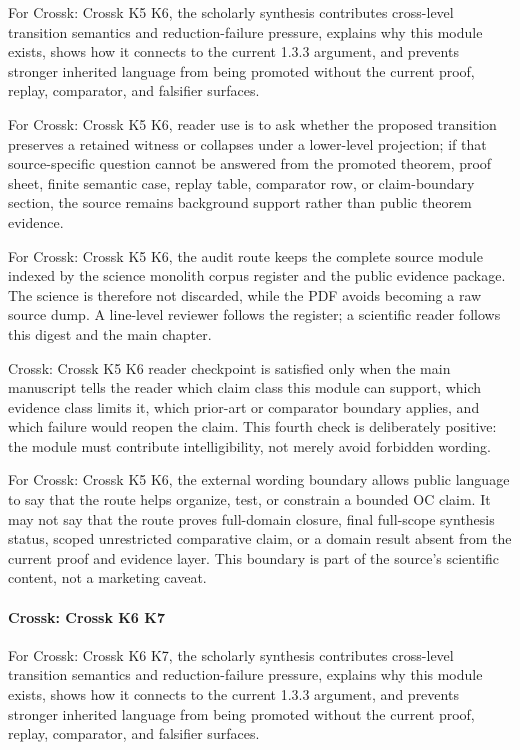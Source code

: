 For Crossk: Crossk K5 K6, the scholarly synthesis contributes cross-level transition semantics and reduction-failure pressure, explains why this module exists, shows how it connects to the current 1.3.3 argument, and prevents stronger inherited language from being promoted without the current proof, replay, comparator, and falsifier surfaces.


For Crossk: Crossk K5 K6, reader use is to ask whether the proposed transition preserves a retained witness or collapses under a lower-level projection; if that source-specific question cannot be answered from the promoted theorem, proof sheet, finite semantic case, replay table, comparator row, or claim-boundary section, the source remains background support rather than public theorem evidence.


For Crossk: Crossk K5 K6, the audit route keeps the complete source module indexed by the science monolith corpus register and the public evidence package. The science is therefore not discarded, while the PDF avoids becoming a raw source dump. A line-level reviewer follows the register; a scientific reader follows this digest and the main chapter.


Crossk: Crossk K5 K6 reader checkpoint is satisfied only when the main manuscript tells the reader which claim class this module can support, which evidence class limits it, which prior-art or comparator boundary applies, and which failure would reopen the claim. This fourth check is deliberately positive: the module must contribute intelligibility, not merely avoid forbidden wording.


For Crossk: Crossk K5 K6, the external wording boundary allows public language to say that the route helps organize, test, or constrain a bounded OC claim. It may not say that the route proves full-domain closure, final full-scope synthesis status, scoped unrestricted comparative claim, or a domain result absent from the current proof and evidence layer. This boundary is part of the source's scientific content, not a marketing caveat.


\paragraph{Crossk: Crossk K6 K7}

For Crossk: Crossk K6 K7, the scholarly synthesis contributes cross-level transition semantics and reduction-failure pressure, explains why this module exists, shows how it connects to the current 1.3.3 argument, and prevents stronger inherited language from being promoted without the current proof, replay, comparator, and falsifier surfaces.


